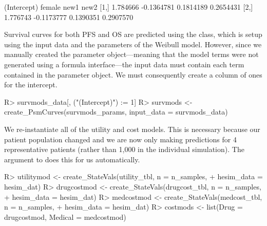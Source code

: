 \documentclass[article, nojss]{jss}\usepackage[]{graphicx}\usepackage[]{color}
\begin{document}
\begin{Schunk}
\begin{Soutput}
     (Intercept)     female      new1      new2
[1,]    1.784666 -0.1364781 0.1814189 0.2654431
[2,]    1.776743 -0.1173777 0.1390351 0.2907570
\end{Soutput}
\end{Schunk}

Survival curves for both PFS and OS are predicted using the  class, which is setup using the input data and the parameters of the Weibull model. However, since we manually created the parameter object---meaning that the model terms were not generated using a formula interface---the input data must contain each term contained in the parameter object. We must consequently create a column of ones for the intercept.

\begin{Schunk}
\begin{Sinput}
R> survmods_data[, ("(Intercept)") := 1]
R> survmods <- create_PsmCurves(survmods_params, input_data = survmods_data)
\end{Sinput}
\end{Schunk}

We re-instantiate all of the utility and cost models. This is necessary because our patient population changed and we are now only making predictions for 4 representative patients (rather than 1,000 in the individual simulation). The  argument to  does this for us automatically. 

\begin{Schunk}
\begin{Sinput}
R> utilitymod <- create_StateVals(utility_tbl, n = n_samples, 
+    hesim_data = hesim_dat)
R> drugcostmod <- create_StateVals(drugcost_tbl, n = n_samples, 
+    hesim_data = hesim_dat)
R> medcostmod <- create_StateVals(medcost_tbl, n = n_samples, 
+    hesim_data = hesim_dat)
R> costmods <- list(Drug = drugcostmod, Medical = medcostmod)
\end{Sinput}
\end{Schunk}
\end{document}
